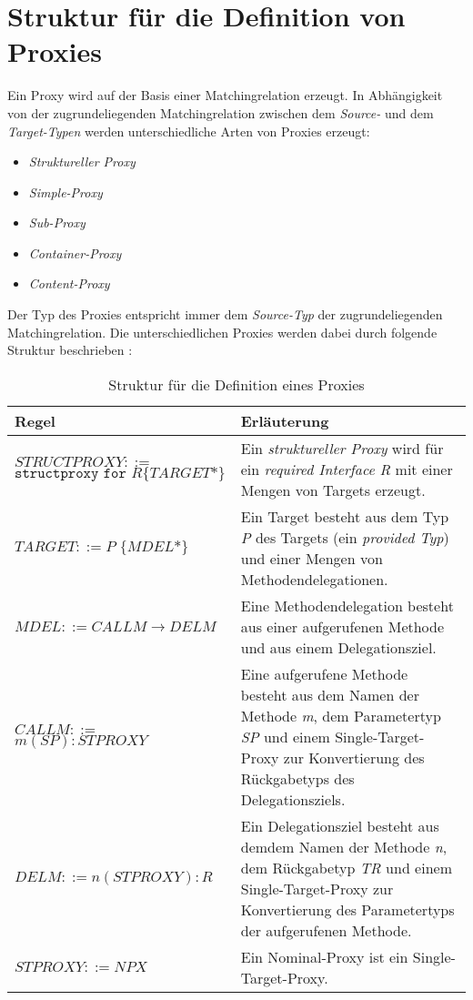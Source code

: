 \documentclass[a4paper,12pt]{article}
\begin{document}
\section{Struktur für die Definition von Proxies}
Ein Proxy wird auf der Basis einer Matchingrelation erzeugt. In Abhängigkeit von der zugrundeliegenden Matchingrelation zwischen dem \emph{Source-} und dem \emph{Target-Typen} werden unterschiedliche Arten von Proxies erzeugt:
\begin{itemize}
\item \emph{Struktureller Proxy}
\item \emph{Simple-Proxy}
\item \emph{Sub-Proxy}
\item \emph{Container-Proxy}
\item \emph{Content-Proxy}
\end{itemize}
Der Typ des Proxies entspricht immer dem \emph{Source-Typ} der zugrundeliegenden Matchingrelation. Die unterschiedlichen Proxies werden dabei durch folgende Struktur beschrieben :
\begin{table}[H]
\centering
\begin{tabular}{|p{6cm}|p{8cm}|}
\hline
\hline
\centering\textbf{Regel} & \textbf{Erläuterung} \\
\hline
\hline
$\mathit{STRUCTPROXY} ::=$\newline $\texttt{structproxy } \texttt{for } R$\newline$ \texttt{\{}TARGET\texttt{*\}}$ & Ein \emph{struktureller Proxy} wird für ein \emph{required Interface R} mit einer Mengen von Targets erzeugt.  \\
\hline
$\mathit{TARGET} ::=$\newline $P \texttt{ \{}MDEL\texttt{*\}}$ & Ein Target besteht aus dem Typ \emph{P} des Targets (ein \emph{provided Typ}) und einer Mengen von Methodendelegationen.\\
\hline
$\mathit{MDEL} ::= CALLM \rightarrow DELM $  & Eine Methodendelegation besteht aus einer aufgerufenen Methode und aus einem Delegationsziel.\\
\hline
$\mathit{CALLM} ::=$\newline $m(SP):STPROXY $  & Eine aufgerufene Methode besteht aus dem Namen der Methode \emph{m}, dem Parametertyp \emph{SP} und einem Single-Target-Proxy zur Konvertierung des Rückgabetyps des Delegationsziels.\\
\hline
$\mathit{DELM} ::=$\newline $n(STPROXY):R $  & Ein Delegationsziel besteht aus demdem Namen der Methode \emph{n}, dem Rückgabetyp \emph{TR} und einem Single-Target-Proxy zur Konvertierung des Parametertyps der aufgerufenen Methode.\\
\hline
$\mathit{STPROXY} ::= NPX$ & Ein Nominal-Proxy ist ein Single-Target-Proxy.\\


\hline
\end{tabular}
\caption{Struktur für die Definition eines Proxies}
 \label{tab:eIShort}
\end{table}
\end{document}
